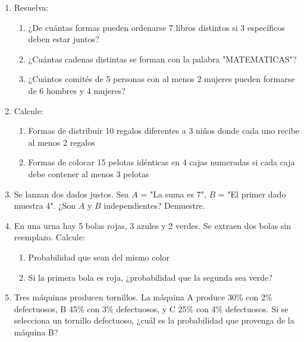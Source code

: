 \documentclass[letterpaper]{article}
\begin{document}
\begin{enumerate}
		\item Resuelva:
		\begin{enumerate}
			\item ¿De cuántas formas pueden ordenarse 7 libros distintos si 3 específicos deben estar juntos?
			\item ¿Cuántas cadenas distintas se forman con la palabra "MATEMATICAS"?
			\item ¿Cuántos comités de 5 personas con al menos 2 mujeres pueden formarse de 6 hombres y 4 mujeres?
		\end{enumerate}
		
		\item Calcule:
		\begin{enumerate}
			\item Formas de distribuir 10 regalos diferentes a 3 niños donde cada uno recibe al menos 2 regalos
			\item Formas de colocar 15 pelotas idénticas en 4 cajas numeradas si cada caja debe contener al menos 3 pelotas
		\end{enumerate}
		
		\item Se lanzan dos dados justos. Sea $A$ = "La suma es 7", $B$ = "El primer dado muestra 4". ¿Son $A$ y $B$ independientes? Demuestre.
		
		\item En una urna hay 5 bolas rojas, 3 azules y 2 verdes. Se extraen dos bolas sin reemplazo. Calcule:
		\begin{enumerate}
			\item Probabilidad que sean del mismo color
			\item Si la primera bola es roja, ¿probabilidad que la segunda sea verde?
		\end{enumerate}
		
		\item Tres máquinas producen tornillos. La máquina A produce 30\% con 2\% defectuosos, B 45\% con 3\% defectuosos, y C 25\% con 4\% defectuosos. Si se selecciona un tornillo defectuoso, ¿cuál es la probabilidad que provenga de la máquina B?
		
	\end{enumerate}
	
	\newpage
\end{document}
